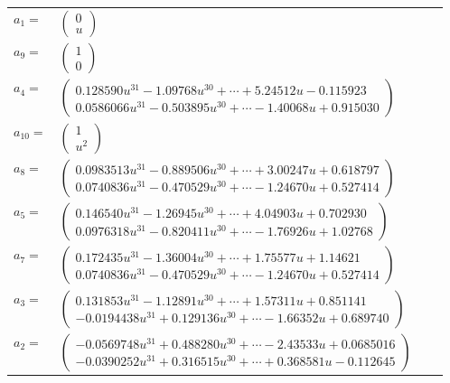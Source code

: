 \documentclass[1p]{elsarticle_modified}
\theoremstyle{definition}
\begin{document}
\begin{tabular}{m{7pt} m{180pt} m{7pt} m{180pt} }
\flushright $a_{1}=$&$\begin{pmatrix}0\\u\end{pmatrix}$ \\
\flushright $a_{9}=$&$\begin{pmatrix}1\\0\end{pmatrix}$ \\
\flushright $a_{4}=$&$\begin{pmatrix}0.128590 u^{31}-1.09768 u^{30}+\cdots+5.24512 u-0.115923\\0.0586066 u^{31}-0.503895 u^{30}+\cdots-1.40068 u+0.915030\end{pmatrix}$ \\
\flushright $a_{10}=$&$\begin{pmatrix}1\\u^2\end{pmatrix}$ \\
\flushright $a_{8}=$&$\begin{pmatrix}0.0983513 u^{31}-0.889506 u^{30}+\cdots+3.00247 u+0.618797\\0.0740836 u^{31}-0.470529 u^{30}+\cdots-1.24670 u+0.527414\end{pmatrix}$ \\
\flushright $a_{5}=$&$\begin{pmatrix}0.146540 u^{31}-1.26945 u^{30}+\cdots+4.04903 u+0.702930\\0.0976318 u^{31}-0.820411 u^{30}+\cdots-1.76926 u+1.02768\end{pmatrix}$ \\
\flushright $a_{7}=$&$\begin{pmatrix}0.172435 u^{31}-1.36004 u^{30}+\cdots+1.75577 u+1.14621\\0.0740836 u^{31}-0.470529 u^{30}+\cdots-1.24670 u+0.527414\end{pmatrix}$ \\
\flushright $a_{3}=$&$\begin{pmatrix}0.131853 u^{31}-1.12891 u^{30}+\cdots+1.57311 u+0.851141\\-0.0194438 u^{31}+0.129136 u^{30}+\cdots-1.66352 u+0.689740\end{pmatrix}$ \\
\flushright $a_{2}=$&$\begin{pmatrix}-0.0569748 u^{31}+0.488280 u^{30}+\cdots-2.43533 u+0.0685016\\-0.0390252 u^{31}+0.316515 u^{30}+\cdots+0.368581 u-0.112645\end{pmatrix}$ \\

\end{tabular}
\end{document}
